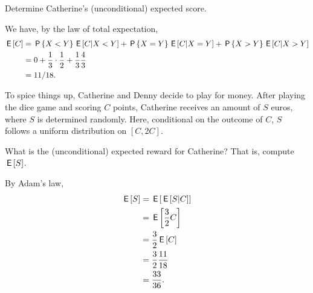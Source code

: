 \begin{exercise}[1.5]
Determine Catherine's (unconditional) expected score.
\begin{solution}
We have, by the law of total expectation,
\begin{align}
    \,\mathsf{E}\left[C\right] &= \,\mathsf{P}\left\{X<Y\right\}\,\mathsf{E}\left[C|X<Y\right] + \,\mathsf{P}\left\{X=Y\right\}\,\mathsf{E}\left[C|X=Y\right] + \,\mathsf{P}\left\{X>Y\right\}\,\mathsf{E}\left[C|X>Y\right] \\
    &= 0 + \frac{1}{3} \cdot \frac{1}{2} + \frac{1}{3} \frac{4}{3} \\
    &= 11/18.
\end{align}
\end{solution}
\end{exercise}

To spice things up, Catherine and Denny decide to play for money. After playing the dice game and scoring $C$ points, Catherine receives an amount of $S$ euros, where $S$ is determined randomly. Here, conditional on the outcome of $C$, $S$ follows a uniform distribution on $[C,2C]$.
\begin{exercise}[1]
What is the (unconditional) expected reward for Catherine? That is, compute $\,\mathsf{E}\left[S\right]$.
\begin{solution}
By Adam's law,
\begin{align}
    \,\mathsf{E}\left[S\right] &= \,\mathsf{E}\left[\,\mathsf{E}\left[S|C\right]\right] \\
    &= \,\mathsf{E}\left[\frac{3}{2}C\right] \\
    &= \frac{3}{2}\,\mathsf{E}\left[C\right] \\
    &= \frac{3}{2} \frac{11}{18} \\
    &= \frac{33}{36}.
\end{align}
\end{solution}
\end{exercise}
